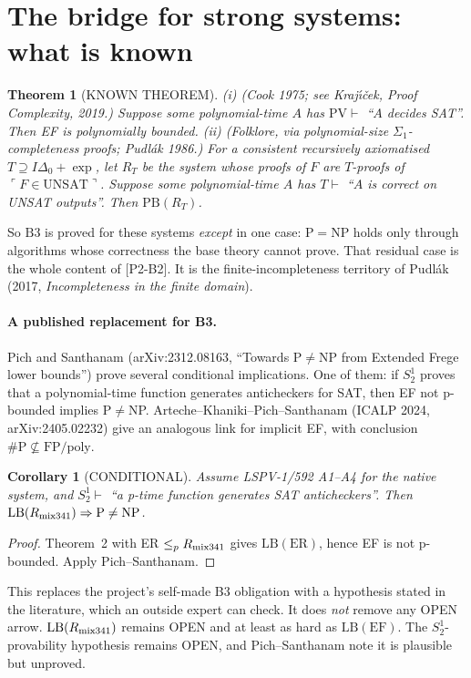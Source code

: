 \documentclass[11pt]{article}
\newtheorem{theorem}{Theorem}
\newtheorem{corollary}{Corollary}
\newcommand{\UNSAT}{\mathrm{UNSAT}}
\newcommand{\LB}{\mathrm{LB}}
\newcommand{\Bthree}{\mathrm{B3}}
\begin{document}
\section{The bridge for strong systems: what is known}
\begin{theorem}[KNOWN THEOREM]
(i) (Cook 1975; see Kraj\'{\i}\v{c}ek, \emph{Proof Complexity}, 2019.)
Suppose some polynomial-time $A$ has $\mathrm{PV}\vdash$ ``$A$ decides SAT''.
Then EF is polynomially bounded.
(ii) (Folklore, via polynomial-size $\Sigma_1$-completeness proofs; Pudlák
1986.) For a consistent recursively axiomatised $T\supseteq I\Delta_0+\exp$,
let $R_T$ be the system whose proofs of $F$ are $T$-proofs of
$\ulcorner F\in\UNSAT\urcorner$. Suppose some polynomial-time $A$ has
$T\vdash$ ``$A$ is correct on UNSAT outputs''. Then $\mathrm{PB}(R_T)$.
\end{theorem}
So $\Bthree$ is proved for these systems \emph{except} in one case:
$\mathrm P=\mathrm{NP}$ holds only through algorithms whose correctness the
base theory cannot prove. That residual case is the whole content of
[P2-B2]. It is the finite-incompleteness territory of Pudl\'ak (2017,
\emph{Incompleteness in the finite domain}).

\paragraph{A published replacement for B3.}
Pich and Santhanam (arXiv:2312.08163, ``Towards P$\neq$NP from Extended Frege
lower bounds'') prove several conditional implications. One of them: if
$S^1_2$ proves that a polynomial-time function generates anticheckers for
SAT, then EF not p-bounded implies P$\neq$NP. Arteche--Khaniki--Pich--Santhanam
(ICALP 2024, arXiv:2405.02232) give an analogous link for implicit EF, with
conclusion $\#\mathrm P\not\subseteq\mathrm{FP/poly}$.

\begin{corollary}[CONDITIONAL]
Assume LSPV-1/592 A1--A4 for the native system, and
$S^1_2\vdash$ ``a p-time function generates SAT anticheckers''. Then
$\LB(R_{\rm mix341})\Rightarrow\mathrm P\neq\mathrm{NP}$.
\end{corollary}
\begin{proof}
Theorem~2 with ER $\le_p R_{\rm mix341}$ gives $\LB(\mathrm{ER})$, hence EF
is not p-bounded. Apply Pich--Santhanam.
\end{proof}
This replaces the project's self-made B3 obligation with a hypothesis
stated in the literature, which an outside expert can check. It does
\emph{not} remove any OPEN arrow. $\LB(R_{\rm mix341})$ remains OPEN and at
least as hard as $\LB(\mathrm{EF})$. The $S^1_2$-provability hypothesis
remains OPEN, and Pich--Santhanam note it is plausible but unproved.
\end{document}
